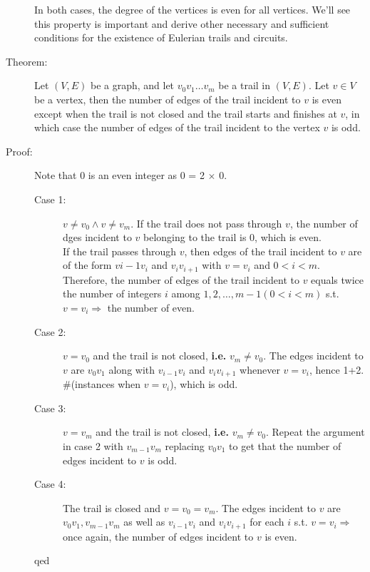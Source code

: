 \documentclass[10pt]{article}
\begin{document}
\begin{description}
\begin{enumerate}
\begin{figure}[h!]
			\end{figure}
		\end{enumerate}
		In both cases, the degree of the vertices is even for all vertices. We'll see this property is important and derive other necessary and sufficient conditions for the existence of Eulerian trails and circuits.
		\item[Theorem:] Let $(V, E)$ be a graph, and let $v_0 v_1 \dots v_m$ be a trail in $(V, E)$. Let $v \in V$ be a vertex, then the number of edges of the trail incident to $v$ is even except when the trail is not closed and the trail starts and finishes at $v$, in which case the number of edges of the trail incident to the vertex $v$ is odd.
		\item[Proof:] Note that 0 is an even integer as 0 = 2 $\times$ 0.
		\begin{description}
			\item[Case 1:] $v \neq v_0 \land v \neq v_m$. If the trail does not pass through $v$, the number of dges incident to $v$ belonging to the trail is 0, which is even. \\
			If the trail passes through $v$, then edges of the trail incident to $v$ are of the form $v{i-1} v_i$ and $v_i v_{i+1}$ with $v = v_i$ and $0 < i < m$. Therefore, the number of edges of the trail incident to $v$ equals twice the number of integers $i$ among $1, 2, \dots, m-1 (0 < i < m)$ s.t. $v= v_i \Rightarrow$ the number of even.
			\item[Case 2:] $v = v_0$ and the trail is not closed, \textbf{i.e.} $v_m \neq v_0$. The edges incident to $v$ are $v_0 v_1$ along with $v_{i-1} v_i$ and $v_i v_{i+1}$ whenever $v=v_i$, hence 1+2. $\#$(instances when $v=v_i$), which is odd.
			\item[Case 3:] $v=v_m$ and the trail is not closed, \textbf{i.e.} $v_m \neq v_0$. Repeat the argument in case 2 with $v_{m-1} v_m$ replacing $v_0 v_1$ to get that the number of edges incident to $v$ is odd.
			\item[Case 4:] The trail is closed and $v = v_0 = v_m$. The edges incident to $v$ are $v_0 v_1, v_{m-1} v_m$ as well as $v_{i-1} v_i$ and $v_i v_{i+1}$ for each $i$ s.t. $v=v_i \Rightarrow$ once again, the number of edges incident to $v$ is even.
			\item[qed]
		\end{description}

\end{description}
\end{document}
